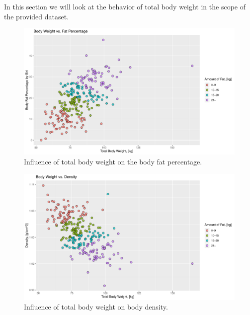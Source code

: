 \documentclass[11pt,american,american]{article}
\begin{document}
In this section we will look at the behavior of total body weight in the scope of the provided dataset.


\begin{figure}[H]
	\centering
	\includegraphics[width=1.0\linewidth]{Images/FIGURES/total_weight_vs_siri}
	\caption{Influence of total body weight on the body fat percentage.}
	\label{fig:total_weight_vs_siri}
\end{figure}


\begin{figure}[H]
	\centering
	\includegraphics[width=1.0\linewidth]{Images/FIGURES/total_weight_vs_density}
	\caption{Influence of total body weight on body density.}
	\label{fig:total_weight_vs_density}
\end{figure}



\end{document}
